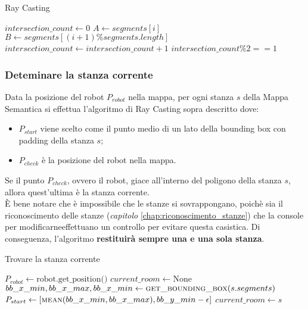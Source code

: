 \begin{algorithm}[h]
  \caption{Ray Casting}
  \begin{algorithmic}[1]
    \State $intersection\_count \gets 0$
    \State $A \gets segments[i]$
    \State $B \gets segments[(i+1) \% segments.length]$
    \State $intersection\_count \gets intersection\_count + 1$
    \EndIf
    \EndFor
    \State \Return $intersection\_count \% 2 == 1$
    \EndProcedure
  \end{algorithmic}
\end{algorithm}

\subsubsection{Deteminare la stanza corrente}

Data la posizione del robot $P_{robot}$ nella mappa, per ogni stanza $s$ della Mappa Semantica si effettua l'algoritmo di Ray Casting sopra descritto dove:
\begin{itemize}
  \item $P_{start}$ viene scelto come il punto medio di un lato della bounding box con padding della stanza $s$;
  \item $P_{check}$ è la posizione del robot nella mappa.
\end{itemize}
Se il punto $P_{check}$, ovvero il robot, giace all'interno del poligono della stanza $s$, allora quest'ultima è la stanza corrente. \\
È bene notare che è impossibile che le stanze si sovrappongano, poichè sia il riconoscimento delle stanze (\textit{capitolo} \ref{chap:riconoscimento_stanze}) che la console per modificarneeffettuano un controllo per evitare questa casistica. Di conseguenza, l'algoritmo \textbf{restituirà sempre una e una sola stanza}.

\begin{algorithm}
  \caption{Trovare la stanza corrente}
  \begin{algorithmic}[1]
    \State $P_{robot} \gets \text{robot.get\_position()}$
    \State $current\_room \gets \text{None}$
    \State $bb\_x\_min, bb\_x\_max, bb\_x\_min \gets \Call{get\_bounding\_box}{s.segments}$
    \State $P_{start} \gets \text{[} \Call{mean}{bb\_x\_min, bb\_x\_max}, bb\_y\_min - \epsilon \text{]}$
    \State $current\_room \gets s$
    \EndIf
    \EndFor
  \end{algorithmic}
\end{algorithm}

